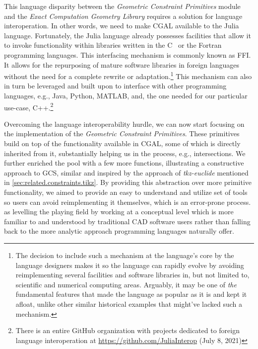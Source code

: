 This language disparity between the \textit{Geometric Constraint Primitives}
module and the \textit{Exact Computation Geometry Library} requires a solution
for language interoperation.  In other words, we need to make \ac{CGAL}
available to the Julia language.  Fortunately, the Julia language already
possesses facilities that allow it to invoke functionality within libraries
written in the C~\cite{Kernighan:1988:C} or the
Fortran~\cite{Backus:1957:Fortran} programming languages.  This interfacing
mechanism is commonly known as \ac{FFI}.  It allows for the repurposing of
mature software libraries in foreign languages without the need for a complete
rewrite or adaptation.\footnote{The decision to include such a mechanism at the
language's core by the language designers makes it so the language can rapidly
evolve by avoiding reimplementing several facilities and software libraries in,
but not limited to, scientific and numerical computing areas.  Arguably, it may
be one of \textit{the} fundamental features that made the language as popular as
it is and kept it afloat, unlike other similar historical examples that might've
lacked such a mechanism.} This mechanism can also in turn be leveraged and built
upon to interface with other programming languages, e.g., Java, Python, MATLAB,
and, the one needed for our particular use-case, C++.\footnote{There is an
entire GitHub organization with projects dedicated to foreign language
interoperation at \url{https://github.com/JuliaInterop} (July 8, 2021)}

Overcoming the language interoperability hurdle, we can now start focusing on
the implementation of the \textit{Geometric Constraint Primitives}.  These
primitives build on top of the functionality available in \ac{CGAL}, some of
which is directly inherited from it, substantially helping us in the process,
e.g., intersections.  We further enriched the pool with a few more functions,
illustrating a constructive approach to \ac{GCS}, similar and inspired by the
approach of \textit{tkz-euclide} mentioned in
\cref{sec:related.constraints.tikz}.  By providing this abstraction over more
primitive functionality, we aimed to provide an easy to understand and utilize
set of tools so users can avoid reimplementing it themselves, which is an
error-prone process.  as levelling the playing field by working at a
conceptual level which is more familiar to and understood by traditional
\ac{CAD} software users rather than falling back to the more analytic approach
programming languages naturally offer.

